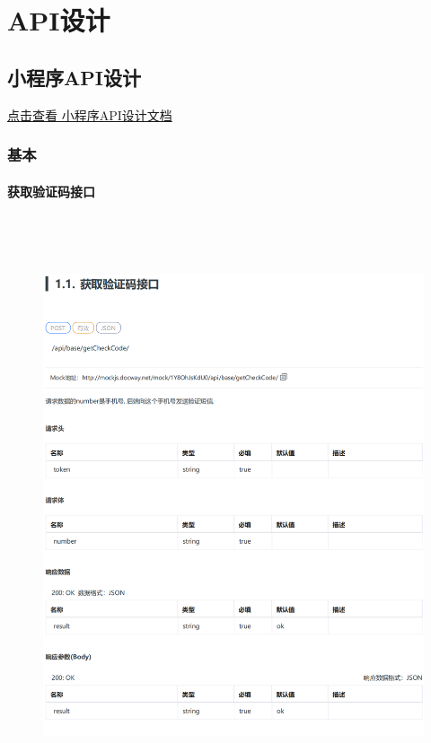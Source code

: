 \chapter{API设计}

\section{小程序API设计}
\href{https://documentation-1303131952.cos.ap-beijing.myqcloud.com/iron_man/%E5%B0%8F%E7%A8%8B%E5%BA%8FAPI.pdf}{点击查看 小程序API设计文档}

\subsection{基本}
\subsubsection{获取验证码接口}
\begin{figure}[h]
    \centering
    \includegraphics[height=17.0cm,width=14.0cm]{design/image/api1.png} 
    \end{figure}
\newpage
